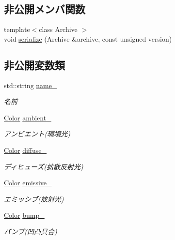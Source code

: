 \subsection*{非公開メンバ関数}
\begin{DoxyCompactItemize}
\item 
{\footnotesize template$<$class Archive $>$ }\\void \mbox{\hyperlink{class_md_bin_data_1_1_material_a5c3a4ba9a609aedbbaee7e0590ea27fc}{serialize}} (Archive \&archive, const unsigned version)
\end{DoxyCompactItemize}
\subsection*{非公開変数類}
\begin{DoxyCompactItemize}
\item 
std\+::string \mbox{\hyperlink{class_md_bin_data_1_1_material_a313cb12160a6bba5bee24cbae74ed091}{name\+\_\+}}
\begin{DoxyCompactList}\small\item\em 名前 \end{DoxyCompactList}\item 
\mbox{\hyperlink{class_md_bin_data_1_1_color}{Color}} \mbox{\hyperlink{class_md_bin_data_1_1_material_a1c102b19537a444f94e541015e3ac7f5}{ambient\+\_\+}}
\begin{DoxyCompactList}\small\item\em アンビエント(環境光) \end{DoxyCompactList}\item 
\mbox{\hyperlink{class_md_bin_data_1_1_color}{Color}} \mbox{\hyperlink{class_md_bin_data_1_1_material_a59cadfc22f9b91655f01414dc16f3e16}{diffuse\+\_\+}}
\begin{DoxyCompactList}\small\item\em ディヒューズ(拡散反射光) \end{DoxyCompactList}\item 
\mbox{\hyperlink{class_md_bin_data_1_1_color}{Color}} \mbox{\hyperlink{class_md_bin_data_1_1_material_aa38e2516efa84118397c533ff3e9b223}{emissive\+\_\+}}
\begin{DoxyCompactList}\small\item\em エミッシブ(放射光) \end{DoxyCompactList}\item 
\mbox{\hyperlink{class_md_bin_data_1_1_color}{Color}} \mbox{\hyperlink{class_md_bin_data_1_1_material_a210d4e9c5d3bdba5144086bfb792eca5}{bump\+\_\+}}
\begin{DoxyCompactList}\small\item\em バンプ(凹凸具合) \end{DoxyCompactList}\item 

\end{DoxyCompactItemize}
